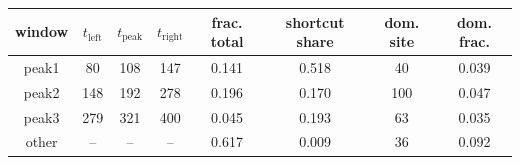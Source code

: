 \begin{tabular}{cccccccc}
\toprule
window & $t_{\mathrm{left}}$ & $t_{\mathrm{peak}}$ & $t_{\mathrm{right}}$ & frac. total & shortcut share & dom. site & dom. frac. \\
\midrule
peak1 & 80 & 108 & 147 & 0.141 & 0.518 & 40 & 0.039 \\
peak2 & 148 & 192 & 278 & 0.196 & 0.170 & 100 & 0.047 \\
peak3 & 279 & 321 & 400 & 0.045 & 0.193 & 63 & 0.035 \\
other & -- & -- & -- & 0.617 & 0.009 & 36 & 0.092 \\
\bottomrule
\end{tabular}